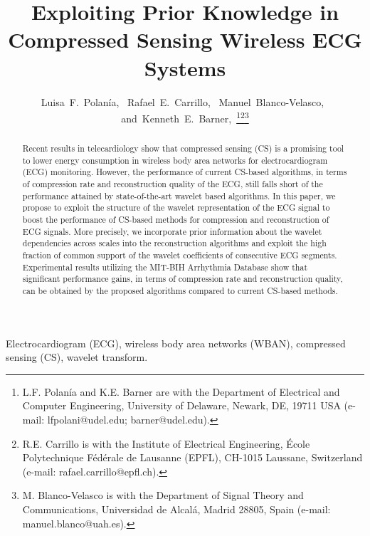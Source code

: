 \documentclass[journal]{IEEEtran}
\begin{document}
\title{Exploiting Prior Knowledge in Compressed Sensing Wireless ECG Systems}

\author{Luisa~F.~Polan\'{i}a,~
        Rafael~E.~Carrillo,~
        Manuel~Blanco-Velasco,~
        and~Kenneth~E.~Barner,~\thanks{L.F. Polan\'{i}a and K.E. Barner are with the Department
of Electrical and Computer Engineering, University of Delaware, Newark, DE, 19711 USA (e-mail: lfpolani@udel.edu; barner@udel.edu).}\thanks{R.E. Carrillo is with the Institute of Electrical Engineering, \'{E}cole Polytechnique F\'{e}d\'{e}rale de Lausanne (EPFL), CH-1015 Laussane, Switzerland (e-mail: rafael.carrillo@epfl.ch).}\thanks{M. Blanco-Velasco is with the Department of Signal Theory and Communications, Universidad de Alcal\'{a}, Madrid 28805, Spain (e-mail: manuel.blanco@uah.es).}}















\maketitle

\begin{abstract}
Recent results in telecardiology show that compressed sensing (CS) is a promising tool to lower energy consumption in wireless body area networks for electrocardiogram (ECG) monitoring. However, the performance of current CS-based algorithms, in terms of compression rate and reconstruction quality of the ECG, still falls short of the performance attained by state-of-the-art wavelet based algorithms. In this paper, we propose to exploit the structure of the wavelet representation of the ECG signal to boost the performance of CS-based methods for compression and reconstruction of ECG signals. More precisely, we incorporate prior information about the wavelet dependencies across scales into the reconstruction algorithms and exploit the high fraction of common support of the wavelet coefficients of consecutive ECG segments. Experimental results utilizing the  MIT-BIH Arrhythmia Database show that significant performance gains, in terms of compression rate and reconstruction quality, can be obtained by the proposed algorithms compared to current CS-based methods.
\end{abstract}
\begin{IEEEkeywords}
Electrocardiogram (ECG), wireless body area networks (WBAN), compressed sensing (CS), wavelet transform.
\end{IEEEkeywords}
\end{document}
